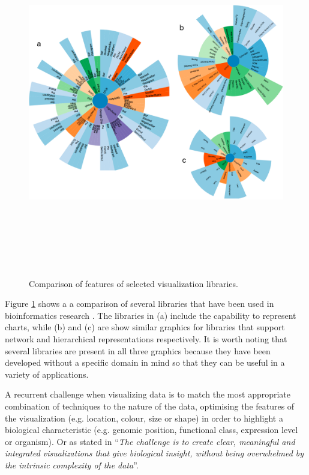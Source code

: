 \begin{figure}  
\includegraphics[height=6in,angle=90]{figures/vis_libs.png}
\caption[Comparison of features of selected visualization libraries.]{Comparison of features of selected visualization libraries.
\label{fig:vis_libs}}
\end{figure}

Figure \ref{fig:vis_libs} shows a a comparison of several libraries that have been used in bioinformatics research \cite{WAN2014}. The libraries in (a) include the capability to represent charts, while (b) and (c) are show similar graphics for libraries that support network and hierarchical representations respectively. It is worth noting that several libraries are present in all three graphics because they have been developed without a specific domain in mind so that they can be useful in a variety of applications.
 
A recurrent challenge when visualizing data is to match the most appropriate combination of techniques to the nature of the data, optimising the features of the visualization (e.g. location, colour, size or shape) in order to highlight a biological characteristic (e.g. genomic position, functional class, expression level or organism). Or as stated in \cite{GEH2010} ``\emph{The challenge is to create clear, meaningful and integrated visualizations that give biological insight, without being overwhelmed by the intrinsic complexity of the data}''.

